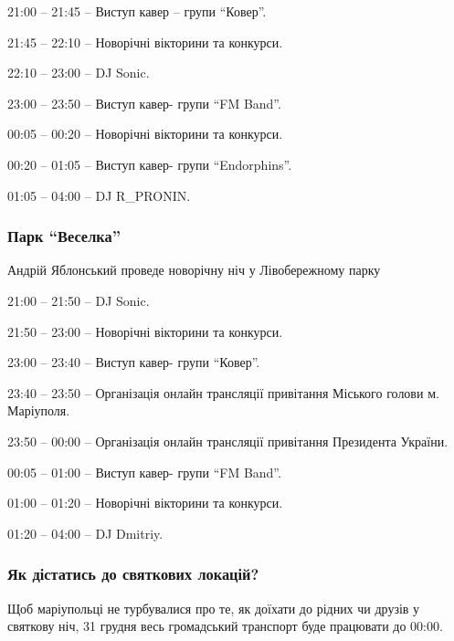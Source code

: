 21:00 – 21:45 – Виступ кавер – групи \enquote{Ковер}.\par
21:45 – 22:10 – Новорічні вікторини та конкурси.\par
22:10 – 23:00 – DJ Sonic.\par
23:00 – 23:50 – Виступ кавер- групи \enquote{FM Band}.\par
00:05 – 00:20 – Новорічні вікторини та конкурси.\par
00:20 – 01:05 – Виступ кавер- групи \enquote{Endorphins}.\par
01:05 – 04:00 – DJ R\_PRONIN.\par

\subsubsection{Парк \enquote{Веселка}}

Андрій Яблонський проведе новорічну ніч у Лівобережному парку


21:00 – 21:50 – DJ Sonic.\par
21:50 – 23:00 – Новорічні вікторини та конкурси.\par
23:00 – 23:40 – Виступ кавер- групи \enquote{Ковер}.\par
23:40 – 23:50 – Організація онлайн трансляції привітання Міського голови м. Маріуполя.\par
23:50 – 00:00 – Організація онлайн трансляції привітання Президента України.\par
00:05 – 01:00 – Виступ кавер- групи \enquote{FM Band}.\par
01:00 – 01:20 – Новорічні вікторини та конкурси.\par
01:20 – 04:00 – DJ Dmitriy.\par

\subsubsection{Як дістатись до святкових локацій?}


Щоб маріупольці не турбувалися про те, як доїхати до рідних чи друзів у
святкову ніч, 31 грудня весь громадський транспорт буде працювати до 00:00.

